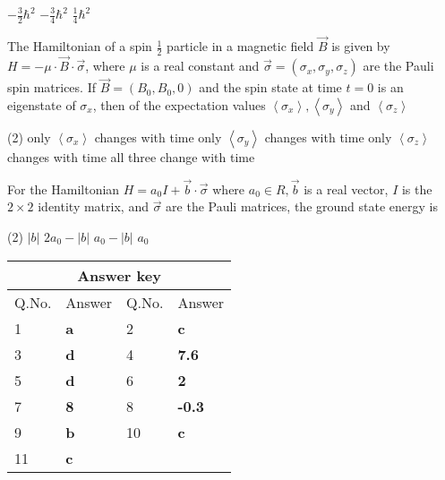 \begin{enumerate}
\begin{tasks}
	\task[\textbf{A.}] $-\frac{3}{2} \hbar^{2}$
	\task[\textbf{B.}]$-\frac{3}{4} \hbar^{2}$
	\task[\textbf{D.}] $\frac{1}{4} \hbar^{2}$
\end{tasks}
\begin{minipage}{\textwidth}
	\item The Hamiltonian of a spin $\frac{1}{2}$ particle in a magnetic field $\vec{B}$ is given by $H=-\mu \cdot \vec{B} \cdot \vec{\sigma}$, where $\mu$ is a real constant and $\vec{\sigma}=\left(\sigma_{x}, \sigma_{y}, \sigma_{z}\right)$ are the Pauli spin matrices. If $\vec{B}=\left(B_{0}, B_{0}, 0\right)$ and the spin state at time $t=0$ is an eigenstate of $\sigma_{x}$, then of the expectation values $\left\langle\sigma_{x}\right\rangle,\left\langle\sigma_{y}\right\rangle$ and $\left\langle\sigma_{z}\right\rangle$
\end{minipage}
\begin{tasks}(2)
	\task[\textbf{A.}] only $\left\langle\sigma_{x}\right\rangle$ changes with time
	\task[\textbf{B.}] only $\left\langle\sigma_{y}\right\rangle$ changes with time
	\task[\textbf{C.}]only $\left\langle\sigma_{z}\right\rangle$ changes with time
	\task[\textbf{D.}]all three change with time
\end{tasks}
\begin{minipage}{\textwidth}
	\item For the Hamiltonian $H=a_{0} I+\vec{b} \cdot \vec{\sigma}$ where $a_{0} \in R, \vec{b}$ is a real vector, $I$ is the $2 \times 2$ identity matrix, and $\vec{\sigma}$ are the Pauli matrices, the ground state energy is
\end{minipage}
\begin{tasks}(2)
	\task[\textbf{A.}] $|b|$
	\task[\textbf{B.}]$2 a_{0}-|b|$
	\task[\textbf{C.}]$a_{0}-|b|$
	\task[\textbf{D.}]$a_{0}$
\end{tasks}
\end{enumerate}

\setlength\arrayrulewidth{1pt}
\begin{table}[H]
	\centering
	
	\begin{tabular}{|p{1.5cm}|p{1.5cm}||p{1.5cm}|p{1.5cm}|}
		\hline
		\multicolumn{4}{|c|}{\textbf{Answer key}}\\\hline\hline
		\rowcolor{ocrel}Q.No.&Answer&Q.No.&Answer\\\hline
		1&\textbf{a}&2&\textbf{c}\\\hline
		3&\textbf{d}&4&\textbf{7.6}\\\hline
		5&\textbf{d}&6&\textbf{2}\\\hline
		7&\textbf{8}&8&\textbf{-0.3}\\\hline
		9&\textbf{b}&10&\textbf{c}\\\hline
		11&\textbf{c}&&\\\hline
	\end{tabular}
\end{table}




